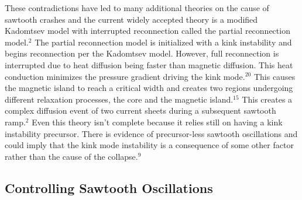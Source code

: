 \documentclass{article}
\begin{document}
\newpage
\begin{SCfigure}
\centering
{}
\end{SCfigure}
\begin{SCfigure}
\centering
{}
\end{SCfigure}
These contradictions have led to many additional theories on the cause of sawtooth crashes and the current widely accepted theory is a modified Kadomtsev model with interrupted reconnection called the partial reconnection model.$^{2}$  The partial reconnection model is initialized with a kink instability and begins reconnection per the Kadomtsev model.  However, full reconnection is interrupted due to heat diffusion being faster than magnetic diffusion.  This heat conduction minimizes the pressure gradient driving the kink mode.$^{20}$  This causes the magnetic island to reach a critical width and creates two regions undergoing different relaxation processes, the core and the magnetic island.$^{15}$  This creates a complex diffusion event of two current sheets during a subsequent sawtooth ramp.$^{2}$  Even this theory isn't complete because it relies still on having a kink instability precursor.  There is evidence of precursor-less sawtooth oscillations and could imply that the kink mode instability is a consequence of some other factor rather than the cause of the collapse.$^{9}$
\subsection{Controlling Sawtooth Oscillations}
\end{document}
